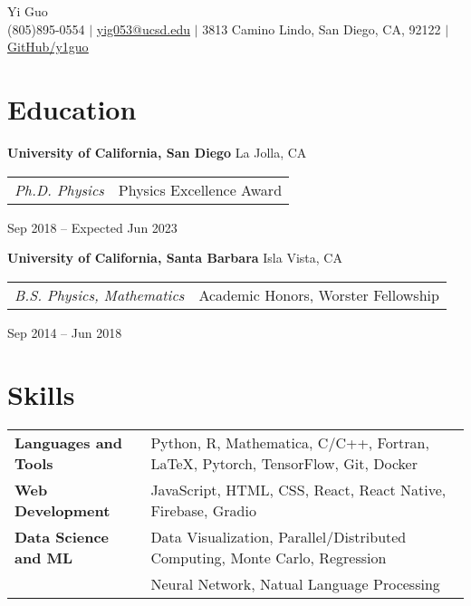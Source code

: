 \documentclass[letterpaper,12pt]{article}
\begin{document}
\newcommand{\name}{Yi Guo}
\newcommand{\phone}{(805)895-0554}
\newcommand{\email}{yig053@ucsd.edu}
\newcommand{\address}{3813 Camino Lindo, San Diego, CA, 92122}
\newcommand{\github}{y1guo}
\newcommand{\linkedin}{y1guo}
\newcommand{\website}{https://y1guo.github.io}

\begin{center}
    \Huge \name \\
    \vspace{1pt}
    \small \phone 
    $|$ \href{mailto:\email}{\underline{\email}} 
    $|$ \address
    $|$ \href{https://github.com/\github}{\underline{GitHub/\github}} 
    \vspace{-15pt}
\end{center}


\section{Education}

\textbf{University of California, San Diego} \hfill La Jolla, CA \\
\begin{tabular}{p{12em} p{20em}}
    \textit{Ph.D. Physics} 
    & Physics Excellence Award 
\end{tabular}
\hfill Sep 2018 -- Expected Jun 2023

\textbf{University of California, Santa Barbara} \hfill Isla Vista, CA \\
\begin{tabular}{p{12em} p{20em}}
    \textit{B.S. Physics, Mathematics}
    & Academic Honors, Worster Fellowship
\end{tabular}
\hfill Sep 2014 -- Jun 2018


\section{Skills}

\begin{tabular}{p{10em} p{33em}}
    \textbf{Languages and Tools} 
    & Python, R, Mathematica, C/C++, Fortran, \LaTeX, Pytorch, TensorFlow, Git, Docker \\
    \textbf{Web Development}
    & JavaScript, HTML, CSS, React, React Native, Firebase, Gradio \\
    \textbf{Data Science and ML} 
    & Data Visualization, Parallel/Distributed Computing, Monte Carlo, Regression \\
    & Neural Network, Natual Language Processing
\end{tabular}
\end{document}
